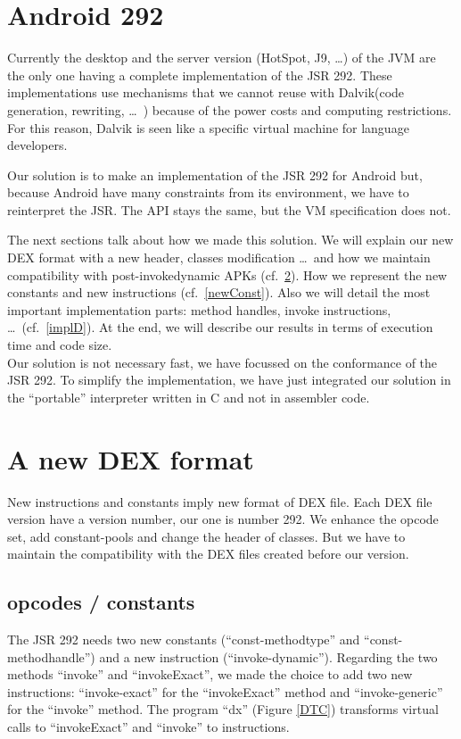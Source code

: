 \documentclass{sig-alternate}
\def \DALVIK{Dalvik\xspace}
\def \Jsr{JSR\xspace}
\def \JSR{\Jsr 292\xspace}
\begin{document}
\section{Android 292}
  Currently the desktop and the server version (HotSpot, J9, \dots) of the JVM are the only one having a complete implementation of the JSR 292.
  These implementations use mechanisms that we cannot reuse with \DALVIK (code generation, rewriting,
  \dots~\cite{jvmsummit-heidinga-mhimpl-2010}\cite{jvmsummit-heidinga-mhimpl-2011}\cite{jvmsummit-rose-mhimpl-2011})
  because of the power costs and computing restrictions.
  For this reason, \DALVIK is seen like a specific virtual machine for language developers.
    
  Our solution is to make an implementation of the JSR 292 for Android but,
  because Android have many constraints from its environment,
  we have to reinterpret the JSR.
  The API stays the same, but the VM specification does not.

  The next sections talk about how we made this solution.
  We will explain our new DEX format with a new header, classes modification
  \dots~and how we maintain compatibility with post-invokedynamic APKs (cf.~\ref{newDEX}).
  How we represent the new constants and new instructions (cf.~\ref{newConst}).
  Also we will detail the most important implementation parts: method handles, invoke instructions, \dots~(cf.~\ref{implD}).
  At the end, we will describe our results in terms of execution time and code size.\\

  Our solution is not necessary fast, we have focussed on the conformance of the \JSR.
  To simplify the implementation, we have just integrated our solution in the ``portable'' interpreter written in C and not in assembler code.
  
\section{A new DEX format}
\label{newDEX}

  New instructions and constants imply new format of DEX file.
  Each DEX file version have a version number, our one is number 292.
  We enhance the opcode set, add constant-pools and change the header of classes.
  But we have to maintain the compatibility with the DEX files created before our version.

  \subsection{opcodes / constants}
    The \JSR needs two new constants (``const-methodtype'' and ``const-methodhandle'') and a new instruction (``invoke-dynamic'').
    Regarding the two methods ``invoke'' and ``invokeExact'', we made the choice to add two new instructions:
    ``invoke-exact'' for the ``invokeExact'' method and ``invoke-generic'' for the ``invoke'' method.
    The program ``dx'' (Figure \ref{DTC}) transforms virtual calls to ``invokeExact'' and ``invoke'' to instructions.
\end{document}
